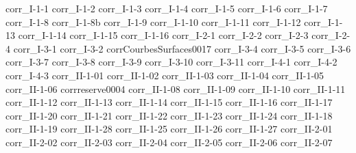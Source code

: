 {corr_I-1-1}
{corr_I-1-2}
{corr_I-1-3}
{corr_I-1-4}
{corr_I-1-5}
{corr_I-1-6}
{corr_I-1-7}
{corr_I-1-8}
{corr_I-1-8b}
{corr_I-1-9}
{corr_I-1-10}
{corr_I-1-11}
{corr_I-1-12}
{corr_I-1-13}
{corr_I-1-14}
{corr_I-1-15}
{corr_I-1-16}
{corr_I-2-1}
{corr_I-2-2}
{corr_I-2-3}
{corr_I-2-4}
{corr_I-3-1}
{corr_I-3-2}
{corrCourbesSurfaces0017}
{corr_I-3-4}
{corr_I-3-5}
{corr_I-3-6}
{corr_I-3-7}
{corr_I-3-8}
{corr_I-3-9}
{corr_I-3-10}
{corr_I-3-11}
{corr_I-4-1}
{corr_I-4-2}
{corr_I-4-3}
{corr_II-1-01}
{corr_II-1-02}
{corr_II-1-03}
{corr_II-1-04}
{corr_II-1-05}
{corr_II-1-06}
{corrreserve0004}
{corr_II-1-08}
{corr_II-1-09}
{corr_II-1-10}
{corr_II-1-11}
{corr_II-1-12}
{corr_II-1-13}
{corr_II-1-14}
{corr_II-1-15}
{corr_II-1-16}
{corr_II-1-17}
{corr_II-1-20}
{corr_II-1-21}
{corr_II-1-22}
{corr_II-1-23}
{corr_II-1-24}
{corr_II-1-18}
{corr_II-1-19}
{corr_II-1-28}
{corr_II-1-25}
{corr_II-1-26}
{corr_II-1-27}
{corr_II-2-01}
{corr_II-2-02}
{corr_II-2-03}
{corr_II-2-04}
{corr_II-2-05}
{corr_II-2-06}
{corr_II-2-07}
